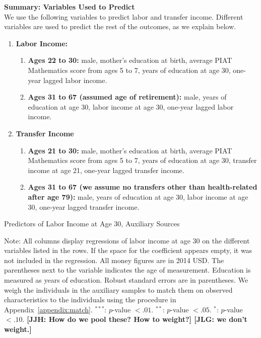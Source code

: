 \noindent \textbf{Summary: Variables Used to Predict}\\
\noindent We use the following variables to predict labor and transfer income. Different variables are used to predict the rest of the outcomes, as we explain below.
\begin{enumerate}
\item \textbf{Labor Income:}
\begin{enumerate}
\item \textbf{Ages 22 to 30:} male, mother's education at birth, average PIAT Mathematics score from ages 5 to 7, years of education at age 30, one-year lagged labor income.
\item \textbf{Ages 31 to 67 (assumed age of retirement):} male, years of education at age 30, labor income at age 30, one-year lagged labor income.
\end{enumerate} 
\item \textbf{Transfer Income}
\begin{enumerate}
\item \textbf{Ages 21 to 30:} male, mother's education at birth, average PIAT Mathematics score from ages 5 to 7, years of education at age 30, transfer income at age 21, one-year lagged transfer income.
\item \textbf{Ages 31 to 67 (we assume no transfers other than health-related after age 79):} male, years of education at age 30, labor income at age 30, one-year lagged transfer income.
\end{enumerate} 
\end{enumerate}

\begin{table}
\begin{threeparttable}
\caption{Predictors of Labor Income at Age 30, Auxiliary Sources}
\label{table:predlaborincome}
\centering
\footnotesize

\begin{tablenotes}
\footnotesize
\item Note: All columns display regressions of labor income at age 30 on the different variables listed in the rows. If the space for the coefficient appears empty, it was not included in the regression. All money figures are in 2014 USD. The parentheses next to the variable indicates the age of measurement. Education is measured as years of education. Robust standard errors are in parentheses. We weigh the individuals in the auxiliary samples to match them on observed characteristics to the individuals using the procedure in Appendix~\ref{appendix:match}. $^{***}$: $p$-value $< .01$. $^{**}$: $p$-value $< .05$. $^{*}$: $p$-value $< .10$. \textbf{[JJH: How do we pool these? How to weight?] [JLG: we don't weight.]}
\end{tablenotes}
\end{threeparttable}
\end{table}

